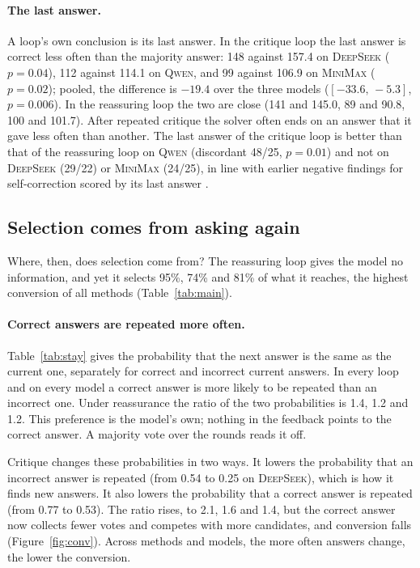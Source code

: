 \documentclass[11pt]{article}
\newcommand{\ds}{\textsc{DeepSeek}}
\newcommand{\qw}{\textsc{Qwen}}
\newcommand{\mm}{\textsc{MiniMax}}
\newcommand{\ci}[2]{$[#1,\,#2]$}
\begin{document}
\paragraph{The last answer.}
A loop's own conclusion is its last answer.
In the critique loop the last answer is correct less often than the majority answer: 148 against 157.4 on \ds{} ($p=0.04$), 112 against 114.1 on \qw, and 99 against 106.9 on \mm{} ($p=0.02$); pooled, the difference is $-19.4$ over the three models (\ci{-33.6}{-5.3}, $p=0.006$).
In the reassuring loop the two are close (141 and 145.0, 89 and 90.8, 100 and 101.7).
After repeated critique the solver often ends on an answer that it gave less often than another.
The last answer of the critique loop is better than that of the reassuring loop on \qw{} (discordant 48/25, $p=0.01$) and not on \ds{} (29/22) or \mm{} (24/25), in line with earlier negative findings for self-correction scored by its last answer \citep{huang2024cannot}.

\subsection{Selection comes from asking again}
\label{sec:mech}

Where, then, does selection come from?
The reassuring loop gives the model no information, and yet it selects 95\%, 74\% and 81\% of what it reaches, the highest conversion of all methods (Table~\ref{tab:main}).

\paragraph{Correct answers are repeated more often.}
Table~\ref{tab:stay} gives the probability that the next answer is the same as the current one, separately for correct and incorrect current answers.
In every loop and on every model a correct answer is more likely to be repeated than an incorrect one.
Under reassurance the ratio of the two probabilities is 1.4, 1.2 and 1.2.
This preference is the model's own; nothing in the feedback points to the correct answer.
A majority vote over the rounds reads it off.

Critique changes these probabilities in two ways.
It lowers the probability that an incorrect answer is repeated (from 0.54 to 0.25 on \ds), which is how it finds new answers.
It also lowers the probability that a correct answer is repeated (from 0.77 to 0.53).
The ratio rises, to 2.1, 1.6 and 1.4, but the correct answer now collects fewer votes and competes with more candidates, and conversion falls (Figure~\ref{fig:conv}).
Across methods and models, the more often answers change, the lower the conversion.
\end{document}
